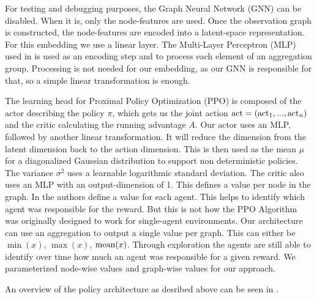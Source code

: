 For testing and debugging purposes, the Graph Neural Network (GNN) can be disabled. When it is, only the node-features are used. Once the observation graph is constructed, the node-features are encoded into a latent-space representation. For this embedding we use a linear layer. The Multi-Layer Perceptron (MLP) used in  is used as an encoding step and to process each element of an aggregation group. Processing is not needed for our embedding, as our GNN is responsible for that, so a simple linear transformation is enough. \par

The learning head for Proximal Policy Optimization (PPO) is composed of the actor describing the policy $\pi$, which gets us the joint action $\textup{act} = (\textup{act}_1,...,\textup{act}_n)$ and the critic calculating the running advantage $A$. Our actor uses an MLP, followed by another linear transformation. It will reduce the dimension from the latent dimension back to the action dimension. This is then used as the mean $\mu$ for a diagonalized Gaussian distribution to support non deterministic policies. The variance $\sigma^2$ uses a learnable logarithmic standard deviation. The critic also uses an MLP with an output-dimension of 1. This defines a value per node in the graph. In  the authors define a value for each agent. This helps to identify which agent was responsible for the reward. But this is not how the PPO Algorithm was originally designed to work for single-agent environments. Our architecture can use an aggregation to output a single value per graph. This can either be $\min(x)$, $\max(x)$, $\textup{mean}(x)$. Through exploration the agents are still able to identify over time how much an agent was responsible for a given reward. We parameterized node-wise values and graph-wise values for our approach. \par

An overview of the policy architecture as desribed above can be seen in .


